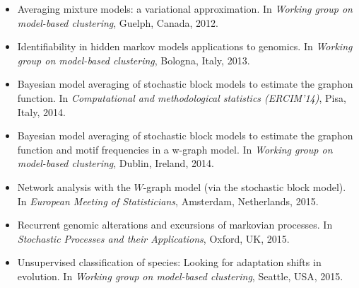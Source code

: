 \begin{itemize}

\item
\newblock Averaging mixture models: a variational approximation.
\newblock In {\em Working group on model-based clustering}, Guelph, Canada,
  2012.

\item
\newblock Identifiability in hidden markov models applications to genomics.
\newblock In {\em Working group on model-based clustering}, Bologna, Italy,
  2013.

\item
\newblock Bayesian model averaging of stochastic block models to estimate the
  graphon function.
\newblock In {\em Computational and methodological statistics (ERCIM'14)},
  Pisa, Italy, 2014.

\item
\newblock Bayesian model averaging of stochastic block models to estimate the
  graphon function and motif frequencies in a w-graph model.
\newblock In {\em Working group on model-based clustering}, Dublin, Ireland,
  2014.

\item
\newblock Network analysis with the {$W$}-graph model (via the stochastic block
  model).
\newblock In {\em European Meeting of Statisticians}, Amsterdam, Netherlands,
  2015.

\item
\newblock Recurrent genomic alterations and excursions of markovian processes.
\newblock In {\em Stochastic Processes and their Applications}, Oxford, UK,
  2015.

\item
\newblock Unsupervised classification of species: Looking for adaptation shifts
  in evolution.
\newblock In {\em Working group on model-based clustering}, Seattle, USA, 2015.

\end{itemize}
